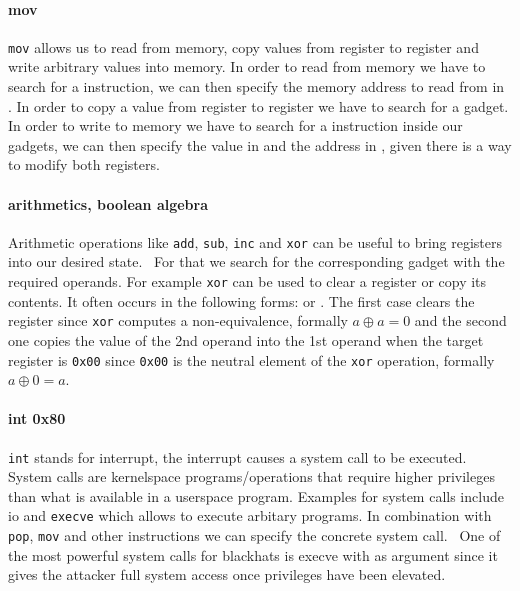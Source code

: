 \documentclass[journal=tosc,submission, notanonymous]{iacrtrans}
\begin{document}
\paragraph{mov}
\Verb+mov+ allows us to read from memory, copy values from register to register and write arbitrary values into memory. In order to read from memory we have to search for a  instruction, we can then specify the memory address to read from in . In order to copy a value from register to register we have to search for a  gadget. In order to write to memory we have to search for a  instruction inside our gadgets, we can then specify the value in  and the address in , given there is a way to modify both registers.
\paragraph{arithmetics, boolean algebra}
Arithmetic operations like \Verb+add+, \Verb+sub+, \Verb+inc+ and \Verb+xor+ can be useful to bring registers into our desired state.~\cite{ropsla} For that we search for the corresponding gadget with the required operands. For example \Verb+xor+ can be used to clear a register or copy its contents. It often occurs in the following forms:  or . The first case clears the register since \Verb+xor+ computes a non-equivalence, formally $a \oplus a = 0$ and the second one copies the value of the 2nd operand into the 1st operand when the target register is \Verb+0x00+ since \Verb+0x00+ is the neutral element of the \Verb+xor+ operation, formally $a \oplus 0 = a$.
\paragraph{int 0x80}
\Verb+int+ stands for interrupt, the interrupt  causes a system call to be executed. System calls are kernelspace programs/operations that require higher privileges than what is available in a userspace program. Examples for system calls include io and \Verb+execve+ which allows to execute arbitary programs. In combination with \Verb+pop+, \Verb+mov+ and other instructions we can specify the concrete system call.~\cite{ropsla} One of the most powerful system calls for blackhats is execve with  as argument since it gives the attacker full system access once privileges have been elevated.
\end{document}

